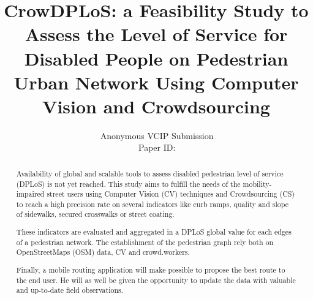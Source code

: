 \documentclass[10pt,conference,a4paper]{IEEEtran}
\title{CrowDPLoS: a Feasibility Study to Assess the Level of Service for Disabled People on Pedestrian Urban Network Using Computer Vision and Crowdsourcing}
\author{%
\,Anonymous VCIP Submission\\
\,Paper ID:

} %
\begin{document}
\maketitle

\begin{figure}[b]
\parbox{\hsize}{\em

}\end{figure}


\begin{abstract}
   Availability of global and scalable tools to assess disabled pedestrian level 
   of service (DPLoS) is not yet reached. This study aims to fulfill the needs 
   of the mobility-impaired street users using Computer Vision (CV) techniques and 
   Crowdsourcing (CS) to reach a high precision rate on several indicators like 
   curb ramps, quality and slope of sidewalks, secured crosswalks or street coating. 
   
   These indicators are evaluated and aggregated in a DPLoS global value for each
   edges of a pedestrian network. The establishment of the pedestrian graph 
   rely both on OpenStreetMaps (OSM) data, CV and crowd.workers.
   
   Finally, a mobile routing application will make possible to propose the best route to the 
   end user. He will as well be given the opportunity to update the data with valuable 
   and up-to-date field observations.
\\[1\baselineskip]
\end{abstract}

%

\end{document}
